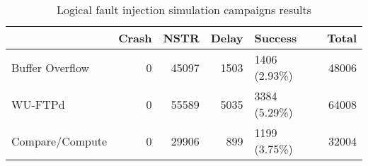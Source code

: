 \begin{table}[H]
\centering
\caption{Logical fault injection simulation campaigns results}
\label{table:end_sim_by_status_wop_multi_bitflip_spatial}
\begin{tabular}{lrrrlr}
\toprule
 & Crash & NSTR & Delay & Success & Total \\
\midrule
Buffer Overflow & 0 & 45097 & 1503 & 1406 (2.93\%) & 48006 \\
WU-FTPd & 0 & 55589 & 5035 & 3384 (5.29\%) & 64008 \\
Compare/Compute & 0 & 29906 & 899 & 1199 (3.75\%) & 32004 \\
\bottomrule
\end{tabular}
\end{table}
